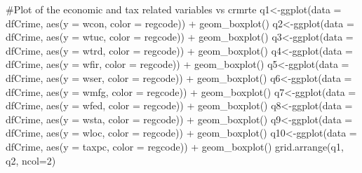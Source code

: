 \documentclass[]{article}
\newenvironment{Shaded}{}{}
\newcommand{\CommentTok}[1]{\textcolor[rgb]{0.00,0.50,0.00}{#1}}
\newcommand{\DataTypeTok}[1]{#1}
\newcommand{\DecValTok}[1]{#1}
\newcommand{\KeywordTok}[1]{\textcolor[rgb]{0.00,0.00,1.00}{#1}}
\newcommand{\NormalTok}[1]{#1}
\newcommand{\OperatorTok}[1]{#1}
\newcommand{\StringTok}[1]{\textcolor[rgb]{0.00,0.50,0.50}{#1}}
\begin{document}
\begin{Shaded}
\begin{Highlighting}[]
\CommentTok{#Plot of the economic and tax related variables vs crmrte}
\NormalTok{q1<-}\KeywordTok{ggplot}\NormalTok{(}\DataTypeTok{data =}\NormalTok{ dfCrime, }\KeywordTok{aes}\NormalTok{(}\DataTypeTok{y =}\NormalTok{ wcon, }\DataTypeTok{color =}\NormalTok{ regcode)) }\OperatorTok{+}
\StringTok{      }\KeywordTok{geom_boxplot}\NormalTok{()}
\NormalTok{q2<-}\KeywordTok{ggplot}\NormalTok{(}\DataTypeTok{data =}\NormalTok{ dfCrime, }\KeywordTok{aes}\NormalTok{(}\DataTypeTok{y =}\NormalTok{ wtuc, }\DataTypeTok{color =}\NormalTok{ regcode)) }\OperatorTok{+}
\StringTok{      }\KeywordTok{geom_boxplot}\NormalTok{()}
\NormalTok{q3<-}\KeywordTok{ggplot}\NormalTok{(}\DataTypeTok{data =}\NormalTok{ dfCrime, }\KeywordTok{aes}\NormalTok{(}\DataTypeTok{y =}\NormalTok{ wtrd, }\DataTypeTok{color =}\NormalTok{ regcode)) }\OperatorTok{+}
\StringTok{      }\KeywordTok{geom_boxplot}\NormalTok{()}
\NormalTok{q4<-}\KeywordTok{ggplot}\NormalTok{(}\DataTypeTok{data =}\NormalTok{ dfCrime, }\KeywordTok{aes}\NormalTok{(}\DataTypeTok{y =}\NormalTok{ wfir, }\DataTypeTok{color =}\NormalTok{ regcode)) }\OperatorTok{+}
\StringTok{      }\KeywordTok{geom_boxplot}\NormalTok{()}
\NormalTok{q5<-}\KeywordTok{ggplot}\NormalTok{(}\DataTypeTok{data =}\NormalTok{ dfCrime, }\KeywordTok{aes}\NormalTok{(}\DataTypeTok{y =}\NormalTok{ wser, }\DataTypeTok{color =}\NormalTok{ regcode)) }\OperatorTok{+}
\StringTok{      }\KeywordTok{geom_boxplot}\NormalTok{()}
\NormalTok{q6<-}\KeywordTok{ggplot}\NormalTok{(}\DataTypeTok{data =}\NormalTok{ dfCrime, }\KeywordTok{aes}\NormalTok{(}\DataTypeTok{y =}\NormalTok{ wmfg, }\DataTypeTok{color =}\NormalTok{ regcode)) }\OperatorTok{+}
\StringTok{      }\KeywordTok{geom_boxplot}\NormalTok{()}
\NormalTok{q7<-}\KeywordTok{ggplot}\NormalTok{(}\DataTypeTok{data =}\NormalTok{ dfCrime, }\KeywordTok{aes}\NormalTok{(}\DataTypeTok{y =}\NormalTok{ wfed, }\DataTypeTok{color =}\NormalTok{ regcode)) }\OperatorTok{+}
\StringTok{      }\KeywordTok{geom_boxplot}\NormalTok{()}
\NormalTok{q8<-}\KeywordTok{ggplot}\NormalTok{(}\DataTypeTok{data =}\NormalTok{ dfCrime, }\KeywordTok{aes}\NormalTok{(}\DataTypeTok{y =}\NormalTok{ wsta, }\DataTypeTok{color =}\NormalTok{ regcode)) }\OperatorTok{+}
\StringTok{      }\KeywordTok{geom_boxplot}\NormalTok{()}
\NormalTok{q9<-}\KeywordTok{ggplot}\NormalTok{(}\DataTypeTok{data =}\NormalTok{ dfCrime, }\KeywordTok{aes}\NormalTok{(}\DataTypeTok{y =}\NormalTok{ wloc, }\DataTypeTok{color =}\NormalTok{ regcode)) }\OperatorTok{+}
\StringTok{      }\KeywordTok{geom_boxplot}\NormalTok{()}
\NormalTok{q10<-}\KeywordTok{ggplot}\NormalTok{(}\DataTypeTok{data =}\NormalTok{ dfCrime, }\KeywordTok{aes}\NormalTok{(}\DataTypeTok{y =}\NormalTok{ taxpc, }\DataTypeTok{color =}\NormalTok{ regcode)) }\OperatorTok{+}
\StringTok{      }\KeywordTok{geom_boxplot}\NormalTok{()}
\KeywordTok{grid.arrange}\NormalTok{(q1, q2, }\DataTypeTok{ncol=}\DecValTok{2}\NormalTok{)}
\end{Highlighting}
\end{Shaded}
\end{document}
